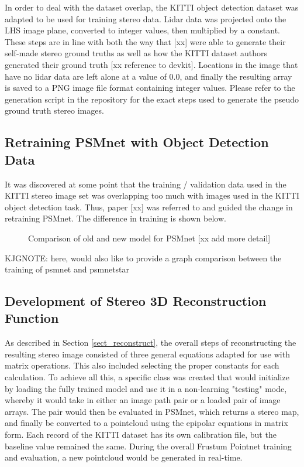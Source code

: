 In order to deal with the dataset overlap, the KITTI object detection dataset was adapted to be used for training stereo data. Lidar data was projected onto the LHS image plane, converted to integer values, then multiplied by a constant. These steps are in line with both the way that [xx] were able to generate their self-made stereo ground truths as well as how the KITTI dataset authors generated their ground truth [xx reference to devkit]. Locations in the image that have no lidar data are left alone at a value of 0.0, and finally the resulting array is saved to a PNG image file format containing integer values. Please refer to the generation script in the repository for the exact steps used to generate the pseudo ground truth stereo images.

\subsection{Retraining PSMnet with Object Detection Data}
It was discovered at some point that the training / validation data used in the KITTI stereo image set was overlapping too much with images used in the KITTI object detection task. Thus, paper [xx] was referred to and guided the change in retraining PSMnet. The difference in training is shown below.

\begin{figure}[H]
    \centering
    \caption{Comparison of old and new model for PSMnet [xx add more detail]}
    \label{new_psmnet}
\end{figure}


KJGNOTE: here, would also like to provide a graph comparison between the training of psmnet and psmnetstar




\subsection{Development of Stereo 3D Reconstruction Function}
As described in Section \ref{sect_reconstruct}, the overall steps of reconstructing the resulting stereo image consisted of three general equations adapted for use with matrix operations. This also included selecting the proper constants for each calculation. To achieve all this, a specific class was created that would initialize by loading the fully trained model and use it in a non-learning "testing" mode, whereby it would take in either an image path pair or a loaded pair of image arrays. The pair would then be evaluated in PSMnet, which returns a stereo map, and finally be converted to a pointcloud using the epipolar equations in matrix form. Each record of the KITTI dataset has its own calibration file, but the baseline value remained the same. During the overall Frustum Pointnet training and evaluation, a new pointcloud would be generated in real-time.

